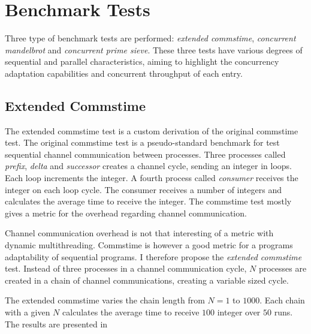 \section{Benchmark Tests}
\label{sec:benchmark_tests}


Three type of benchmark tests are performed: \textit{extended commstime}, \textit{concurrent mandelbrot} and \textit{concurrent prime sieve}. These three tests have various degrees of sequential and parallel characteristics, aiming to highlight the concurrency adaptation capabilities and concurrent throughput of each entry.


\subsection{Extended Commstime}


The extended commstime test is a custom derivation of the original commstime test. The original commstime test \citep{roger2001commstime} is a pseudo\hyp{}standard benchmark for test sequential channel communication between processes. Three processes called \textit{prefix}, \textit{delta} and \textit{successor} creates a channel cycle, sending an integer in loops. Each loop increments the integer. A fourth process called \textit{consumer} receives the integer on each loop cycle. The consumer receives a number of integers and calculates the average time to receive the integer. The commstime test mostly gives a metric for the overhead regarding channel communication.

Channel communication overhead is not that interesting of a metric with dynamic multithreading. Commstime is however a good metric for a programs adaptability of sequential programs. I therefore propose the \textit{extended commstime} test. Instead of three processes in a channel communication cycle, $N$ processes are created in a chain of channel communications, creating a variable sized cycle.

The extended commstime varies the chain length from $N=1$ to $1000$. Each chain with a given $N$ calculates the average time to receive $100$ integer over $50$ runs. The results are presented in 

